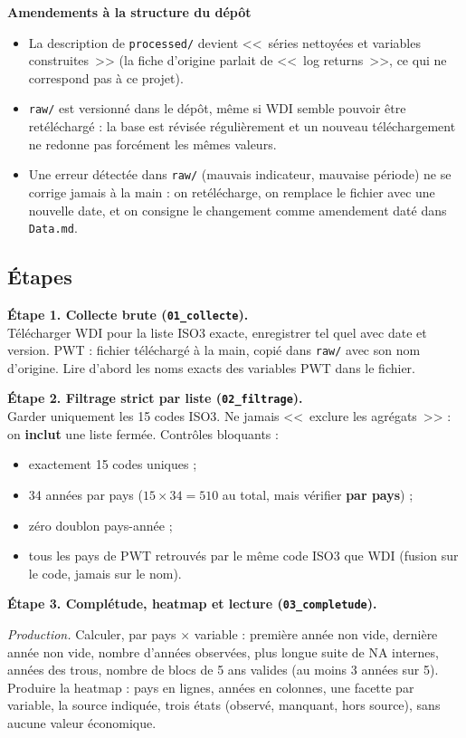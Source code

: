 \documentclass[21pt,a4paper]{article}
\begin{document}
	\textbf{Amendements à la structure du dépôt}
	\begin{itemize}
		\item La description de \texttt{processed/} devient <<~séries nettoyées et variables construites~>> (la fiche d'origine parlait de <<~log returns~>>, ce qui ne correspond pas à ce projet).
		\item \texttt{raw/} est versionné dans le dépôt, même si WDI semble pouvoir être retéléchargé : la base est révisée régulièrement et un nouveau téléchargement ne redonne pas forcément les mêmes valeurs.
		\item Une erreur détectée dans \texttt{raw/} (mauvais indicateur, mauvaise période) ne se corrige jamais à la main : on retélécharge, on remplace le fichier avec une nouvelle date, et on consigne le changement comme amendement daté dans \texttt{Data.md}.
	\end{itemize}
	
	\subsection{Étapes}
	\label{sec:etapes}
	
	\textbf{Étape 1. Collecte brute (\texttt{01\_collecte}).}\\
	Télécharger WDI pour la liste ISO3 exacte, enregistrer tel quel avec date et version. PWT : fichier téléchargé à la main, copié dans \texttt{raw/} avec son nom d'origine. Lire d'abord les noms exacts des variables PWT dans le fichier.
	
	\textbf{Étape 2. Filtrage strict par liste (\texttt{02\_filtrage}).}\\
	Garder uniquement les 15 codes ISO3. Ne jamais <<~exclure les agrégats~>> : on \textbf{inclut} une liste fermée. Contrôles bloquants :
	\begin{itemize}
		\item exactement 15 codes uniques ;
		\item 34 années par pays ($15 \times 34 = 510$ au total, mais vérifier \textbf{par pays}) ;
		\item zéro doublon pays-année ;
		\item tous les pays de PWT retrouvés par le même code ISO3 que WDI (fusion sur le code, jamais sur le nom).
	\end{itemize}
	
	\textbf{Étape 3. Complétude, heatmap et lecture (\texttt{03\_completude}).}
	
	\textit{Production.} Calculer, par pays $\times$ variable : première année non vide, dernière année non vide, nombre d'années observées, plus longue suite de NA internes, années des trous, nombre de blocs de 5 ans valides (au moins 3 années sur 5). Produire la heatmap : pays en lignes, années en colonnes, une facette par variable, la source indiquée, trois états (observé, manquant, hors source), sans aucune valeur économique.
	
\end{document}
